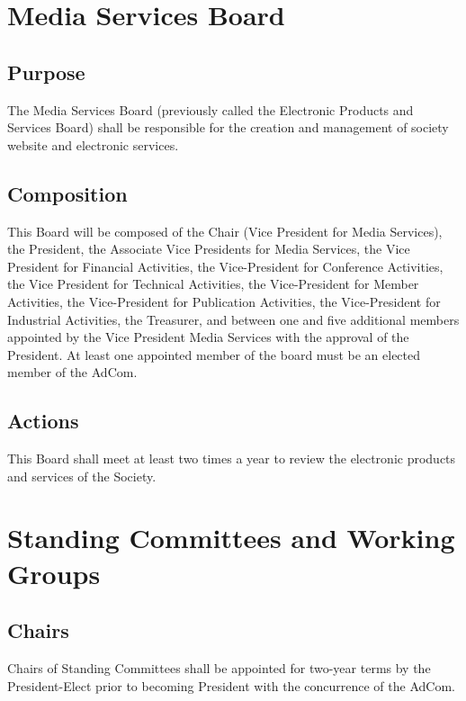 \documentclass[10pt]{article}
\begin{document}
\section{Media Services Board}
\label{MSB}

\subsection{Purpose}

The Media Services Board (previously called the Electronic Products and Services Board) shall be responsible for the creation and management of society website and electronic services.

\subsection{Composition}

This Board will be composed of the Chair (Vice President for Media Services), the President, the Associate Vice Presidents for Media Services, the Vice President for Financial Activities, the Vice-President for Conference Activities,  the Vice President for Technical Activities, the Vice-President for Member Activities, the Vice-President for Publication Activities, the Vice-President for Industrial Activities, the Treasurer, and between one and five additional members appointed by the Vice President Media Services with the approval of the President. At least one appointed member of the board must be an elected member of the AdCom.  

\subsection{Actions}

This Board shall meet at least two times a year to review the electronic products and services of the Society.


\section{Standing Committees and Working Groups}
\label{StandingCommittees}

\subsection{Chairs}

Chairs of Standing Committees shall be appointed for two-year terms by the President-Elect prior to becoming President with the concurrence of the AdCom.
\end{document}
